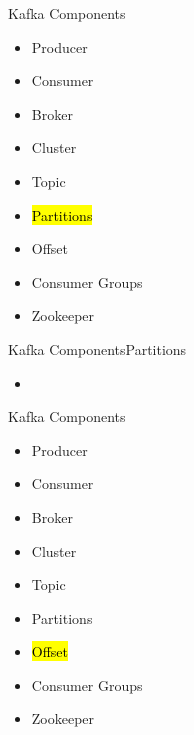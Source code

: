 \documentclass{beamer}
\begin{document}
\begin{frame}{Kafka Components}
  \begin{itemize}
    \item Producer
    \item Consumer
    \item Broker
    \item Cluster
    \item Topic
    \item \hl{Partitions}
    \item Offset
    \item Consumer Groups
    \item Zookeeper
  \end{itemize}
\end{frame}

\begin{frame}{Kafka Components}{Partitions}
  \begin{itemize}
    \item
  \end{itemize}
\end{frame}

\begin{frame}{Kafka Components}
  \begin{itemize}
    \item Producer
    \item Consumer
    \item Broker
    \item Cluster
    \item Topic
    \item Partitions
    \item \hl{Offset}
    \item Consumer Groups
    \item Zookeeper
  \end{itemize}
\end{frame}
\end{document}
